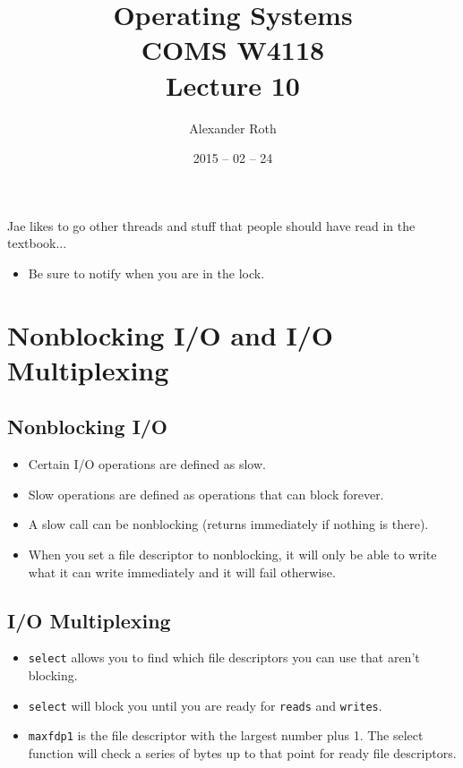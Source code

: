 \documentclass[]{article}
\begin{document}
\newcommand{\code}{\texttt}
\newtheorem{thm}{Theorem}
\title{Operating Systems \\ COMS W4118 \\ Lecture 10}
\author{Alexander Roth}
\date{2015 -- 02 -- 24}
\maketitle

Jae likes to go other threads and stuff that people should have read in the
textbook...
\begin{itemize}
\item Be sure to notify when you are in the lock.
\end{itemize}

\section{Nonblocking I/O and I/O Multiplexing}
\subsection{Nonblocking I/O}
\begin{itemize}
\item Certain I/O operations are defined as slow.
\item Slow operations are defined as operations that can block forever.
\item A slow call can be nonblocking (returns immediately if nothing is there).
\item When you set a file descriptor to nonblocking, it will only be able to
write what it can write immediately and it will fail otherwise.
\end{itemize}

\subsection{I/O Multiplexing}
\begin{itemize}
\item \code{select} allows you to find which file descriptors you can use that
aren't blocking.
\item \code{select} will block you until you are ready for \code{reads} and
\code{writes}.
\item \code{maxfdp1} is the file descriptor with the largest number plus 1. The
select function will check a series of bytes up to that point for ready file
descriptors.
\end{itemize}
\end{document}
